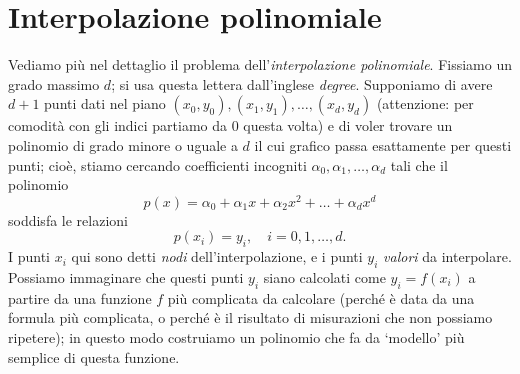 \documentclass[a4paper]{report}
\theoremstyle{definition}
\theoremstyle{remark}
\newcommand{\x}{\mathbf{x}}
\begin{document}
\begin{center}
\end{center}


\section{Interpolazione polinomiale}

Vediamo più nel dettaglio il problema dell'\emph{interpolazione polinomiale}. Fissiamo un grado massimo $d$; si usa questa lettera dall'inglese \emph{degree}. Supponiamo di avere $d+1$ punti dati nel piano $(x_0, y_0), (x_1, y_1), \dots, (x_{d}, y_{d})$ (attenzione: per comodità con gli indici partiamo da $0$ questa volta) e di voler trovare un polinomio di grado minore o uguale a $d$ il cui grafico passa esattamente per questi punti; cioè, stiamo cercando coefficienti incogniti $\alpha_0, \alpha_1, \dots, \alpha_d$ tali che il polinomio
\[
p(x) = \alpha_0 + \alpha_1 x + \alpha_2 x^2 + \dots + \alpha_d x^d
\]
soddisfa le relazioni
\begin{equation} \label{interpolazione_polinomiale}
p(x_i) = y_i, \quad i=0,1,\dots,d.
\end{equation}
I punti $x_i$ qui sono detti \emph{nodi} dell'interpolazione, e i punti $y_i$ \emph{valori} da interpolare. Possiamo immaginare che questi punti $y_i$ siano calcolati come $y_i = f(x_i)$ a partire da una funzione $f$ più complicata da calcolare (perché è data da una formula più complicata, o perché è il risultato di misurazioni che non possiamo ripetere); in questo modo costruiamo un polinomio che fa da `modello' più semplice di questa funzione.
\end{document}
